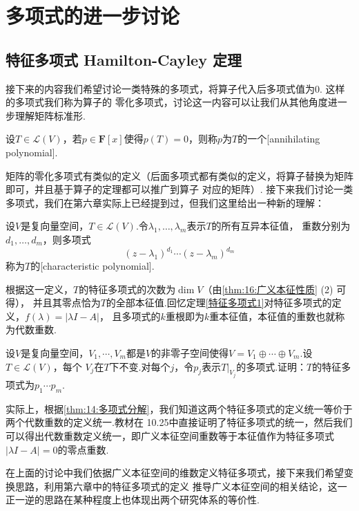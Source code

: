 \chapter{多项式的进一步讨论}

\section{特征多项式 \quad Hamilton-Cayley 定理}
接下来的内容我们希望讨论一类特殊的多项式，将算子代入后多项式值为0. 这样的多项式我们称为算子的
零化多项式，讨论这一内容可以让我们从其他角度进一步理解矩阵标准形.
\begin{definition}
    设$T\in \mathcal{L}(V)$，若$p\in\mathbf{F}[x]$使得$p(T)=0$，则称$p$为$T$的一个[annihilating polynomial].
\end{definition}
矩阵的零化多项式有类似的定义（后面多项式都有类似的定义，将算子替换为矩阵即可，并且基于算子的定理都可以推广到算子
对应的矩阵）. 接下来我们讨论一类多项式，我们在第六章实际上已经提到过，但我们这里给出一种新的理解：
\begin{definition}
    设$V$是复向量空间，$T\in \mathcal{L}(V)$.令$\lambda_1,\ldots,\lambda_m$表示$T$的所有互异本征值，
    重数分别为$d_1,\ldots,d_m$，则多项式\[(z-\lambda_1)^{d_1}\cdots(z-\lambda_m)^{d_m}\]
    称为$T$的[characteristic polynomial].
\end{definition}
根据这一定义，$T$的特征多项式的次数为$\dim V$（由\autoref{thm:16:广义本征性质} (2) 可得）， %
并且其零点恰为$T$的全部本征值.回忆定理\ref{特征多项式1}对特征多项式的定义，$f(\lambda)=|\lambda I-A|$，
且多项式的$k$重根即为$k$重本征值，本征值的重数也就称为代数重数.
\begin{example}
    设$V$是复向量空间，$V_1,\cdots,V_m$都是$V$的非零子空间使得$V=V_1\oplus\cdots\oplus V_m$.设$T\in \mathcal{L}(V)$，每个
    $V_j$在$T$下不变.对每个$j$，令$p_j$表示$T|_{V_j}$的多项式.证明：$T$的特征多项式为$p_1\cdots p_m$.
\end{example}
实际上，根据\autoref{thm:14:多项式分解}，我们知道这两个特征多项式的定义统一等价于两个代数重数的定义统一.教材在
10.25中直接证明了特征多项式的统一，然后我们可以得出代数重数定义统一，即广义本征空间重数等于本征值作为特征多项式
$|\lambda I-A|=0$的零点重数.

在上面的讨论中我们依据广义本征空间的维数定义特征多项式，接下来我们希望变换思路，利用第六章中的特征多项式的定义
推导广义本征空间的相关结论，这一正一逆的思路在某种程度上也体现出两个研究体系的等价性.

